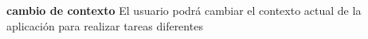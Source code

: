 \begin{functional}
	\item \textbf{cambio de contexto}\newline
		El usuario podrá cambiar el contexto actual de la aplicación para realizar tareas diferentes
\end{functional}